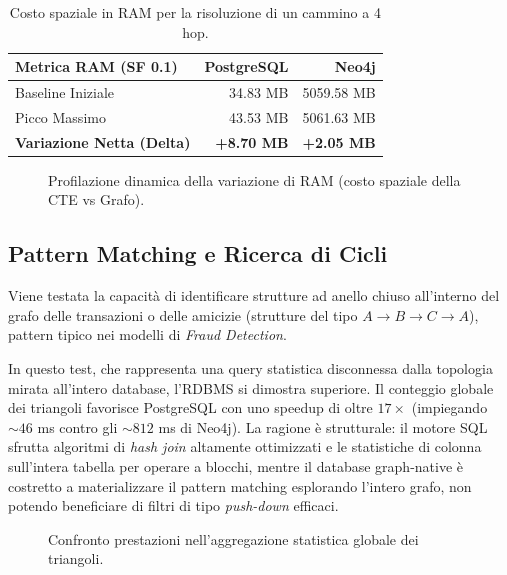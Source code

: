 \begin{table}[hbt!]
  \centering
  \begin{tabular}{lrr}
    \hline
    \textbf{Metrica RAM (SF 0.1)} & \textbf{PostgreSQL} & \textbf{Neo4j} \\
    \hline
    Baseline Iniziale & 34.83 MB & 5059.58 MB \\
    Picco Massimo & 43.53 MB & 5061.63 MB \\
    \textbf{Variazione Netta (Delta)} & \textbf{+8.70 MB} & \textbf{+2.05 MB} \\
    \hline
  \end{tabular}
  \caption{Costo spaziale in RAM per la risoluzione di un cammino a 4 hop.}
  \label{tab:ram_usage}
\end{table}

\begin{figure}[hbt!]
  \centering
  
  \caption{Profilazione dinamica della variazione di RAM (costo spaziale della CTE vs Grafo).}
  \label{fig:ram_plot}
\end{figure}

\subsection{Pattern Matching e Ricerca di Cicli}
Viene testata la capacità di identificare strutture ad anello chiuso all'interno del grafo delle transazioni o delle amicizie (strutture del tipo $A \rightarrow B \rightarrow C \rightarrow A$), pattern tipico nei modelli di \textit{Fraud Detection}.

In questo test, che rappresenta una query statistica disconnessa dalla topologia mirata all'intero database, l'RDBMS si dimostra superiore. Il conteggio globale dei triangoli favorisce PostgreSQL con uno speedup di oltre $17\times$ (impiegando $\sim 46$ ms contro gli $\sim 812$ ms di Neo4j). La ragione è strutturale: il motore SQL sfrutta algoritmi di \textit{hash join} altamente ottimizzati e le statistiche di colonna sull'intera tabella per operare a blocchi, mentre il database graph-native è costretto a materializzare il pattern matching esplorando l'intero grafo, non potendo beneficiare di filtri di tipo \textit{push-down} efficaci.

\begin{figure}[hbt!]
  \centering
  
  \caption{Confronto prestazioni nell'aggregazione statistica globale dei triangoli.}
  \label{fig:triangle_plot}
\end{figure}

